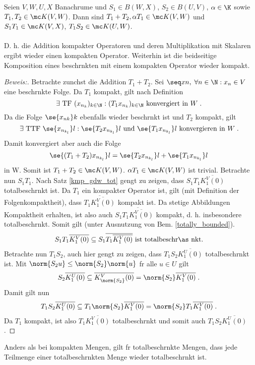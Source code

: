\begin{theorem}
	\label{composition_compact_bounded}
	Seien \(V,W, U, X\) Banachr\as ume und  \(S_1\in B(W,X)\), \(S_2\in B(U,V)\), \;\(\alpha \in \K\) sowie \(T_1, T_2\in \mc K(V,W)\). Dann sind \(T_1 + T_2, \alpha T_1 \in \mc K(V,W)\) und \(S_1 T_1\in \mc K(V,X)\), \(T_1S_2\in \mc K(U,W)\). \\ \\  D. h. die Addition kompakter Operatoren und deren Multiplikation mit Skalaren ergibt wieder einen kompakten Operator. Weiterhin ist die beidseitige Komposition eines beschr\as nkten mit einem kompakten Operator wieder kompakt.
\end{theorem}
\begin{proof}[Beweis:]
	Betrachte zun\as chst die Addition \(T_1 + T_2\). Sei \(\seq xn,\; \forall n\in\N: x_n \in V\) eine beschr\as nkte Folge. Da $T_1$ kompakt, gilt nach Definition
	\[\exists \text{ TF } (x_{n_k})_{k\in\N}: (T_1 x_{n_k})_{k\in\N} \text{ konvergiert in } W\;.\]
	Da die Folge \(\se {x_{nk}}k\) ebenfalls wieder beschr\as nkt ist und $T_2$ kompakt, gilt
	\[\exists\text{ TTF } \se {x_{n_{k_l}}}l:  \se { T_2 x_{n_{k_l}}}l \text{ und } \se {T_ 1x_{n_{k_l}}}l \text{ konvergieren in }W \;.\]
	Damit konvergiert aber auch die Folge
	\[\se {(T_1 + T_2) x_{n_{k_l}}}l = \se { T_2 x_{n_{k_l}}}l + \se {T_ 1x_{n_{k_l}}}l \]
	in W. Somit ist \(T_1 + T_2 \in \mc K(V,W)\). \(\alpha T_1 \in \mc K(V,W)\) ist trivial. Betrachte nun \(S_1 T_1\). Nach Satz \ref{kmp_gdw_tot}  gen\us gt zu zeigen, dass \(S_1 T_1 \overline{K_1^V(0)}\) totalbeschr\as nkt ist. Da $T_1$ ein kompakter Operator ist, gilt (mit Definition der Folgenkompaktheit), dass \(\overline{T_1\overline{K_1^V(0)}}\) kompakt ist. Da stetige Abbildungen Kompaktheit erhalten, ist also auch \(S_1 \overline{T_1\overline{K_1^V(0)}}\) kompakt, d. h. insbesondere totalbeschr\as nkt. Somit gilt (unter Ausnutzung von Bem. \ref{totally_bounded}).
	\[S_1 T_1 \overline{K_1^V(0)} \subseteq S_1\overline{T_1\overline{K_1^V(0)}} \text{ ist totalbeschr\as nkt.}\]
	Betrachte nun \(T_1S_2\), auch hier gen\us gt zu zeigen, dass \(T_1S_2 \overline{K_1^U(0)}\) totalbeschr\as nkt ist. Mit \(\norm {S_2 u} \leq \norm{S_2}\norm{u}\) f\us r alle \(u\in U\) gilt
	\[S_2 \overline{K_1^U(0)} \subseteq \overline{K_{\norm{S_2}}^V(0)} = \norm{S_2} \overline{K_1^V(0)}\;.\]
	Damit gilt nun 
	\[T_1S_2 \overline{K_1^U(0)} \subseteq T_1\norm{S_2} \overline{K_1^V(0)} = \norm{S_2} T_1\overline{K_1^V(0)}\;.\]
	Da $T_1$ kompakt, ist also \(T_1 \overline{K_1^V(0)}\) totalbeschr\as nkt und somit auch \(T_1S_2\overline{K_1^U(0)}\).
\end{proof}
\begin{rem}
	\label{totally_bounded}
	Anders als bei kompakten Mengen, gilt f\us r totalbeschr\as nkte Mengen, dass jede Teilmenge einer totalbeschr\as nkten Menge wieder totalbeschr\as nkt ist.
\end{rem}

